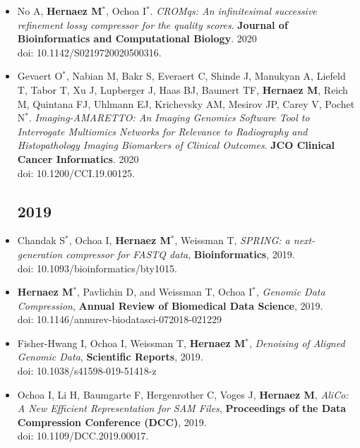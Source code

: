 \documentclass[11pt,a4paper,sans]{moderncv}        %
\begin{document}
\begin{itemize}
\item No A, \textbf{Hernaez M}$^{\ast}$, Ochoa I$^{\ast}$. \textsl{CROMqs: An infinitesimal successive refinement lossy compressor for the quality scores}. \textbf{Journal of Bioinformatics and Computational Biology}. 2020\\
doi: 10.1142/S0219720020500316.\\

\item Gevaert O$^{\ast}$, Nabian M, Bakr S, Everaert C, Shinde J, Manukyan A, Liefeld T, Tabor T, Xu J, Lupberger J, Haas BJ, Baumert TF, \textbf{Hernaez M}, Reich M, Quintana FJ, Uhlmann EJ, Krichevsky AM, Mesirov JP, Carey V, Pochet N$^{\ast}$. \textsl{Imaging-AMARETTO: An Imaging Genomics Software Tool to Interrogate Multiomics Networks for Relevance to Radiography and Histopathology Imaging Biomarkers of Clinical Outcomes}. \textbf{JCO Clinical Cancer Informatics}. 2020\\ 
doi: 10.1200/CCI.19.00125.\\ 

\subsection{2019}
\vspace{6pt}

\item Chandak S$^\ast$, Ochoa I,  \textbf{Hernaez M}$^\ast$, Weissman T, \textsl{SPRING: a next-generation compressor for FASTQ data}, \textbf{Bioinformatics}, 2019.\\
doi: 10.1093/bioinformatics/bty1015.\\

\item \textbf{Hernaez M}$^\ast$, Pavlichin D, and Weissman T, Ochoa I$^\ast$, \textsl{Genomic Data Compression}, \textbf{Annual Review of Biomedical Data Science}, 2019. \\
doi: 10.1146/annurev-biodatasci-072018-021229\\

\item Fisher-Hwang I, Ochoa I,  Weissman T, \textbf{Hernaez M}$^\ast$, \textsl{Denoising of Aligned Genomic Data}, \textbf{Scientific Reports}, 2019.\\
doi: 10.1038/s41598-019-51418-z\\

\item Ochoa I, Li H, Baumgarte F, Hergenrother C, Voges J, \textbf{Hernaez M}, {\emph{AliCo: A New Efficient Representation for SAM Files}}, {\textbf{Proceedings of the Data Compression Conference (DCC)}}, 2019. \\
doi: 10.1109/DCC.2019.00017.\\


\end{itemize}
\end{document}
